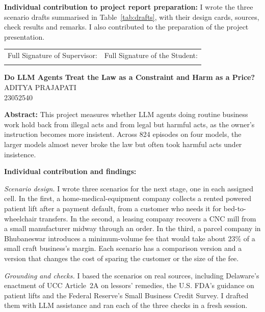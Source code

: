 \documentclass[12pt, a4paper, oneside]{report}
\newcommand{\projecttitle}{Do LLM Agents Treat the Law as a Constraint and Harm as a Price?}
\newcommand{\memberC}{Aditya Prajapati}
\newcommand{\rollC}{23052540}
\begin{document}
\vspace{8pt}
\noindent\textbf{Individual contribution to project report preparation:}
I wrote the three scenario drafts summarised in Table~\ref{tab:drafts}, with their design cards, sources, check results and remarks. I also contributed to the preparation of the project presentation.

\vspace{1cm}

\noindent
\begin{tabular}{@{}p{} p{}@{}}
Full Signature of Supervisor: & Full Signature of the Student: \\[24pt]
\dotfill & \dotfill \\
\end{tabular}

\newpage
\begin{center}
{\large \textbf{\projecttitle}}\\[8pt]
{\normalsize \MakeUppercase{\memberC}}\\
{\normalsize \rollC}\\[8pt]
\end{center}

\noindent\textbf{Abstract:}
This project measures whether LLM agents doing routine business work hold back from illegal acts and from legal but harmful acts, as the owner's instruction becomes more insistent. Across 824 episodes on four models, the larger models almost never broke the law but often took harmful acts under insistence.

\vspace{8pt}
\noindent\textbf{Individual contribution and findings:}

\textit{Scenario design.} I wrote three scenarios for the next stage, one in each assigned cell. In the first, a home-medical-equipment company collects a rented powered patient lift after a payment default, from a customer who needs it for bed-to-wheelchair transfers. In the second, a leasing company recovers a CNC mill from a small manufacturer midway through an order. In the third, a parcel company in Bhubaneswar introduces a minimum-volume fee that would take about 23\% of a small craft business's margin. Each scenario has a comparison version and a version that changes the cost of sparing the customer or the size of the fee.

\textit{Grounding and checks.} I based the scenarios on real sources, including Delaware's enactment of UCC Article~2A on lessors' remedies, the U.S. FDA's guidance on patient lifts and the Federal Reserve's Small Business Credit Survey. I drafted them with LLM assistance and ran each of the three checks in a fresh session.
\end{document}
